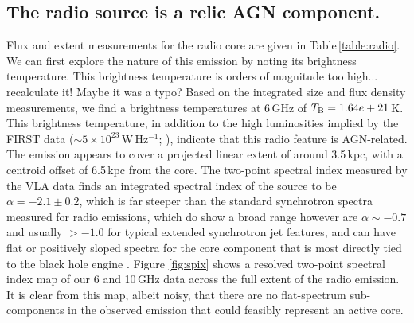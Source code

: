 \documentclass[useAMS,usenatbib]{emulateapj}
\newcommand{\fixme}[1]{{\color{red} #1 }}
\begin{document}
\subsection{The radio source is a relic AGN component.}
Flux and extent measurements for the radio core are given in Table\,\ref{table:radio}. We can first explore the nature of this emission by noting its brightness temperature. 
\fixme{This brightness temperature is orders of magnitude too high... recalculate it! Maybe it was a typo?}
Based on the integrated size and flux density measurements, we find a brightness temperatures at 6\,GHz of $T_{\rm B} = 1.64e+21$\,K. This brightness temperature, in addition to the high luminosities implied by the FIRST data ($\sim5\times10^23$\,W\,Hz$^{-1}$; \citealt{postman12}), indicate that this radio feature is AGN-related. The emission appears to cover a projected linear extent of around 3.5\,kpc, with a centroid offset of 6.5\,kpc from the core.
The two-point spectral index measured by the VLA data finds an integrated spectral index of the source to be $\alpha=-2.1\pm0.2$, which is far steeper than the standard synchrotron spectra measured for radio emissions, which do show a broad range however are $\alpha\sim-0.7$ and usually $>-1.0$ for typical extended synchrotron jet features, and can have flat or positively sloped spectra for the core component that is most directly tied to the black hole engine \citep{ref,ref}. Figure \ref{fig:spix} shows a resolved two-point spectral index map of our 6 and 10\,GHz data across the full extent of the radio emission. It is clear from this map, albeit noisy, that there are no flat-spectrum sub-components in the observed emission that could feasibly represent an active core.
\end{document}
